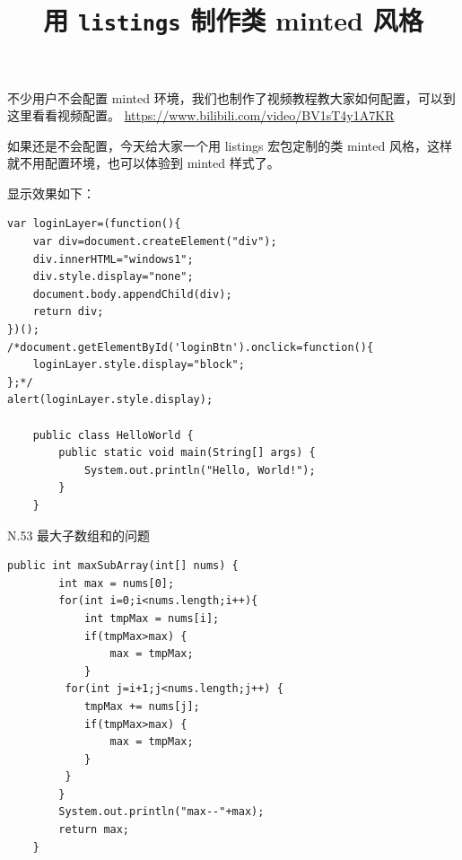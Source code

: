 \documentclass[10pt]{ctexart}
\begin{document}
\newpage
\tableofcontents
\newpage

\clearpage %


\clearpage


\newpage
 
\title{用  \texttt{listings} 制作类 minted 风格}

\maketitle

不少用户不会配置 minted 环境，我们也制作了视频教程教大家如何配置，可以到这里看看视频配置。
\url{https://www.bilibili.com/video/BV1sT4y1A7KR}


如果还是不会配置，今天给大家一个用
listings 宏包定制的类 minted 风格，这样就不用配置环境，也可以体验到 minted 样式了。



显示效果如下：
\begin{lstlisting}
var loginLayer=(function(){
    var div=document.createElement("div");
    div.innerHTML="windows1";
    div.style.display="none";
    document.body.appendChild(div);
    return div;
})();
/*document.getElementById('loginBtn').onclick=function(){
    loginLayer.style.display="block";
};*/
alert(loginLayer.style.display);

    public class HelloWorld {
        public static void main(String[] args) {
            System.out.println("Hello, World!");
        }
    }
\end{lstlisting}

\newpage
N.53 最大子数组和的问题
\begin{lstlisting}
public int maxSubArray(int[] nums) {
        int max = nums[0];
        for(int i=0;i<nums.length;i++){
            int tmpMax = nums[i];
            if(tmpMax>max) {
                max = tmpMax;
            }
         for(int j=i+1;j<nums.length;j++) {
            tmpMax += nums[j];
            if(tmpMax>max) {
                max = tmpMax;
            }
         }
        }
        System.out.println("max--"+max);
        return max;
    }
\end{lstlisting}
\end{document}
